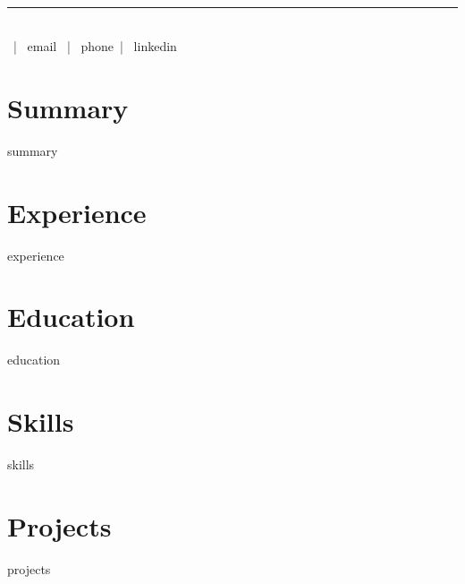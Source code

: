 \documentclass[11pt]{article}
\begin{document}
\pagestyle{empty}
\\
\textcolor{accent}{\rule{\linewidth}{1pt}}\\[6pt]
 ~|~ {email} ~|~ {phone}~|~ {linkedin}
\vspace{10pt}

\section*{Summary}
{summary}

\section*{Experience}
{experience}

\section*{Education}
{education}

\section*{Skills}
{skills}

\section*{Projects}
{projects}
\end{document}
